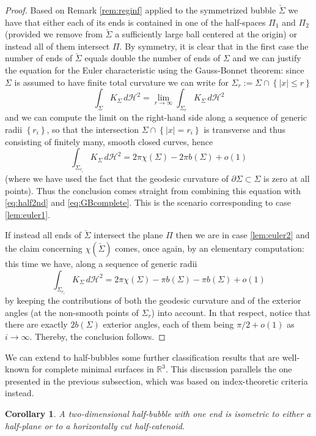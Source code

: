 \documentclass[10pt]{amsart}
\newcounter{cas}
\newtheorem{cor}[thm]{Corollary}
\theoremstyle{definition}
\newcommand{\R}{\mathbb{R}}
\newcommand{\h}{\mathscr{H}}
\begin{document}
\begin{proof}
Based on Remark \ref{rem:reginf} applied to the symmetrized bubble $\check{\Sigma}$ we have that either each of its ends is contained in one of the half-spaces $\Pi_1$ and $\Pi_2$ (provided we remove from $\check{\Sigma}$ a sufficiently large ball centered at the origin) or instead all of them intersect $\Pi$. By symmetry, it is clear that in the first case the number of ends of $\check{\Sigma}$ equals double the number of ends of $\Sigma$ and we can justify the equation for the Euler characteristic using the Gauss-Bonnet theorem: since $\Sigma$ is assumed to have finite total curvature we can write for $\Sigma_r:=\Sigma \cap \left\{|x|\leq r\right\}$
\[
\int_{\Sigma}K_{\Sigma}\,d\h^2=\lim_{r\to\infty}\int_{\Sigma_r} K_{\Sigma}\,d\h^2
\]
and we can compute the limit on the right-hand side along a sequence of generic radii $\left\{r_i\right\}$, so that the intersection $\Sigma\cap \left\{|x|=r_i\right\}$ is transverse and thus consisting of finitely many, smooth closed curves, hence
\[
\int_{\Sigma_{r_i}} K_{\Sigma}\,d\h^2=2\pi \chi(\Sigma)-2\pi b(\Sigma)+o(1)
\]
(where we have used the fact that the geodesic curvature of $\partial\Sigma\subset\Sigma$ is zero at all points).
Thus the conclusion comes straight from combining this equation with \eqref{eq:half2nd} and \eqref{eq:GBcomplete}. This is the scenario corresponding to case \eqref{lem:euler1}.

If instead all ends of $\check{\Sigma}$ intersect the plane $\Pi$ then we are in case \eqref{lem:euler2} and the claim concerning $\chi(\check{\Sigma})$ comes, once again, by an elementary computation: this time we have, along a sequence of generic radii
\[
\int_{\Sigma_{r_i}} K_{\Sigma}\,d\h^2=2\pi \chi(\Sigma)-\pi b(\Sigma)-\pi b(\Sigma)+o(1)
\]
by keeping the contributions of both the geodesic curvature and of the exterior angles (at the non-smooth points of $\Sigma_r$) into account. In that respect, notice that there are exactly $2b(\Sigma)$ exterior angles, each of them being $\pi/2+o(1)$ as $i\to\infty$. Thereby, the conclusion follows.
\end{proof}

We can extend to half-bubbles some further classification results that are well-known for complete minimal surfaces in $\R^3$. This discussion parallels the one presented in the previous subsection, which was based on index-theoretic criteria instead.

\begin{cor}\label{cor:oneend}
A two-dimensional half-bubble with one end is isometric to either a half-plane or to a horizontally cut half-catenoid.
\end{cor}
\end{document}
